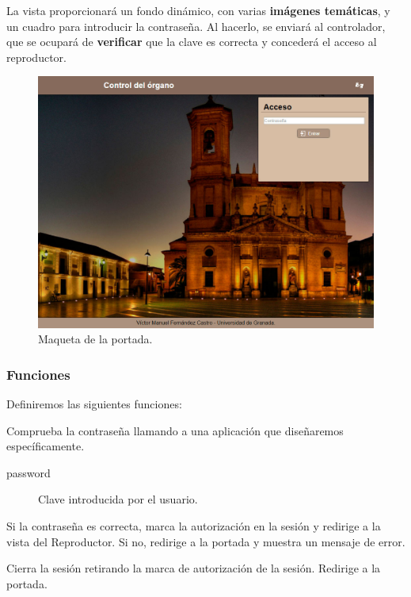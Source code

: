 La vista proporcionará un fondo dinámico, con varias \textbf{imágenes temáticas}, y un cuadro para introducir la contraseña. Al hacerlo, se enviará al controlador, que se ocupará de \textbf{verificar} que la clave es correcta y concederá el acceso al reproductor.

\smallskip

\begin{figure}[H]
	\noindent \begin{centering}
		\includegraphics[width=\linewidth*3/4]{capitulo4/cap_portada}
		\par\end{centering}
	\smallskip
	\caption{\label{fig:cap_portada} Maqueta de la portada.}
\end{figure}

\smallskip

\subsubsection{Funciones}

Definiremos las siguientes funciones:

\begin{description}[style=nextline]
	\item[login (password)]
	Comprueba la contraseña llamando a una aplicación que diseñaremos específicamente.
	
	\begin{description}
		\item[password] Clave introducida por el usuario.
	\end{description}
	
	Si la contraseña es correcta, marca la autorización en la sesión y redirige a la vista del Reproductor. Si no, redirige a la portada y muestra un mensaje de error.
	
	\item[logout ()]
	Cierra la sesión retirando la marca de autorización de la sesión. Redirige a la portada.
	
\end{description}

